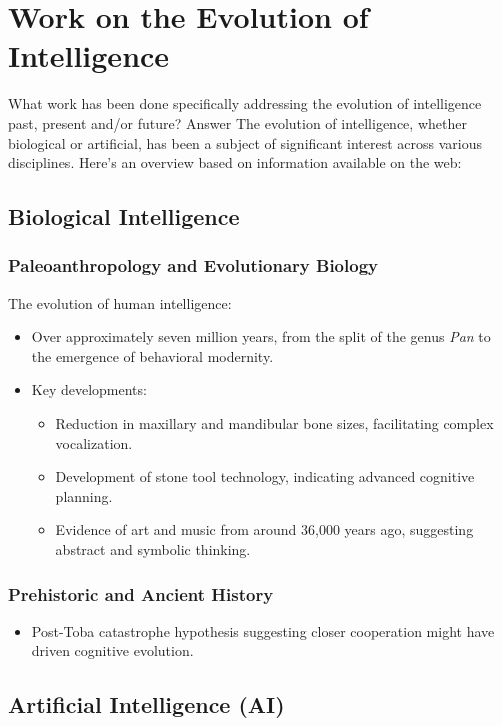 \documentclass[10pt,titlepage]{book}
\begin{document}
\section{Work on the Evolution of Intelligence}
   
   What work has been done specifically addressing the evolution of intelligence past, present and/or future?
Answer
The evolution of intelligence, whether biological or artificial, has been a subject of significant interest across various disciplines. Here's an overview based on information available on the web:

\subsection{Biological Intelligence}

\subsubsection{Paleoanthropology and Evolutionary Biology}
The evolution of human intelligence:
\begin{itemize}
    \item Over approximately seven million years, from the split of the genus \emph{Pan} to the emergence of behavioral modernity.
    \item Key developments:
    \begin{itemize}
        \item Reduction in maxillary and mandibular bone sizes, facilitating complex vocalization.
        \item Development of stone tool technology, indicating advanced cognitive planning.
        \item Evidence of art and music from around 36,000 years ago, suggesting abstract and symbolic thinking.
    \end{itemize}
\end{itemize}

\subsubsection{Prehistoric and Ancient History}
\begin{itemize}
    \item Post-Toba catastrophe hypothesis suggesting closer cooperation might have driven cognitive evolution.
\end{itemize}

\subsection{Artificial Intelligence (AI)}
\end{document}
